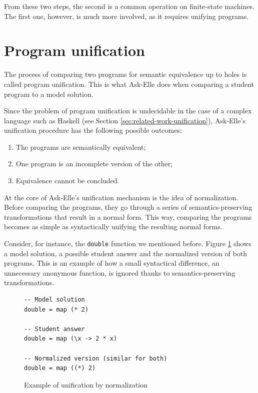 From these two steps, the second is a common operation on finite-state machines. The first one, however, is much more involved, as it requires unifying programs.

\section{Program unification}
\label{sec:bg-unification}

The process of comparing two programs for semantic equivalence up to holes is called program unification. This is what Ask-Elle does when comparing a student program to a model solution.

Since the problem of program unification is undecidable in the case of a complex language such as Haskell (see Section \ref{sec:related-work-unification}), Ask-Elle's unification procedure has the following possible outcomes:

\begin{enumerate}
    \item The programs are semantically equivalent;
    \item One program is an incomplete version of the other;
    \item Equivalence cannot be concluded.
\end{enumerate}

At the core of Ask-Elle's unification mechanism is the idea of normalization. Before comparing the programs, they go through a series of semantics-preserving transformations that result in a normal form. This way, comparing the programs becomes as simple as syntactically unifying the resulting normal forms.

Consider, for instance, the \texttt{double} function we mentioned before. Figure \ref{fig:bg-unification-normalization} shows a model solution, a possible student answer and the normalized version of both programs. This is an example of how a small syntactical difference, an unnecessary anonymous function, is ignored thanks to semantics-preserving transformations.

\begin{figure}[H]
\begin{verbatim}
-- Model solution
double = map (* 2)

-- Student answer
double = map (\x -> 2 * x)

-- Normalized version (similar for both)
double = map ((*) 2)
\end{verbatim}
\caption{Example of unification by normalization}
\label{fig:bg-unification-normalization}
\end{figure}
